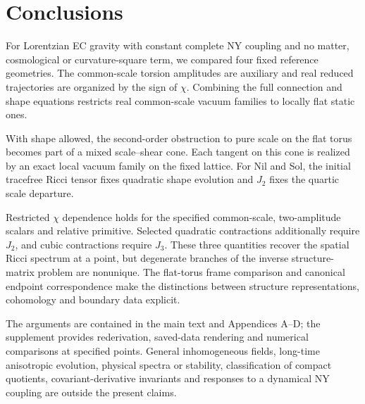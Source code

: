 \section{Conclusions}

For Lorentzian EC gravity with constant complete NY coupling and no matter, cosmological or curvature-square term, we compared four fixed reference geometries. The common-scale torsion amplitudes are auxiliary and real reduced trajectories are organized by the sign of $\chi$. Combining the full connection and shape equations restricts real common-scale vacuum families to locally flat static ones.

With shape allowed, the second-order obstruction to pure scale on the flat torus becomes part of a mixed scale--shear cone. Each tangent on this cone is realized by an exact local vacuum family on the fixed lattice. For Nil and Sol, the initial tracefree Ricci tensor fixes quadratic shape evolution and $J_2$ fixes the quartic scale departure.

Restricted $\chi$ dependence holds for the specified common-scale, two-amplitude scalars and relative primitive. Selected quadratic contractions additionally require $J_2$, and cubic contractions require $J_3$. These three quantities recover the spatial Ricci spectrum at a point, but degenerate branches of the inverse structure-matrix problem are nonunique. The flat-torus frame comparison and canonical endpoint correspondence make the distinctions between structure representations, cohomology and boundary data explicit.

The arguments are contained in the main text and Appendices A--D; the supplement provides rederivation, saved-data rendering and numerical comparisons at specified points. General inhomogeneous fields, long-time anisotropic evolution, physical spectra or stability, classification of compact quotients, covariant-derivative invariants and responses to a dynamical NY coupling are outside the present claims.
